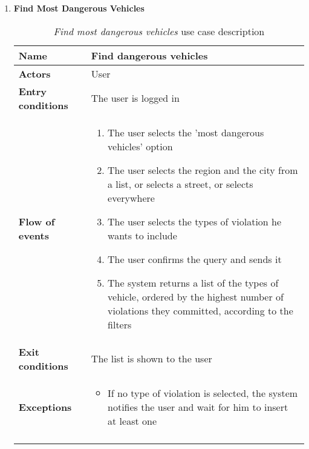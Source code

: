 \begin{enumerate}
		\item \textbf{Find Most Dangerous Vehicles}
			\begin{longtable}{p{0.25\linewidth}p{0.75\linewidth}}
				\toprule
				\textbf{Name} & \textbf{Find dangerous vehicles} \\
				\midrule
				\textbf{Actors} & User \\
				\midrule
				\textbf{Entry conditions} & The user is logged in \\
				\midrule
				\textbf{Flow of events} & 
				\begin{enumerate}
					\item The user selects the 'most dangerous vehicles' option
					\item The user selects the region and the city from a list, or selects a street, or selects everywhere
					\item The user selects the types of violation he wants to include
					\item The user confirms the query and sends it
					\item The system returns a list of the types of vehicle, ordered by the highest number of violations they committed, according to the filters
				\end{enumerate} \\
				\midrule
				\textbf{Exit conditions} & The list is shown to the user\\
				\midrule
				\textbf{Exceptions} & 
				\begin{itemize}
					\item 	If no type of violation is selected, the system notifies the user and wait for him to insert at least one	
				\end{itemize} \\
				\bottomrule
				\caption{\emph{Find most dangerous vehicles} use case description}
			\end{longtable}
		

\end{enumerate}
